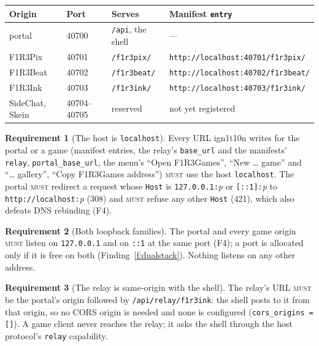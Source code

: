 \documentclass[11pt]{article}
\theoremstyle{definition}
\newtheorem{requirement}{Requirement}
\theoremstyle{remark}
\newcommand{\MUST}{\textsc{must}}
\newcommand{\code}[1]{\texttt{#1}}
\newcommand{\Hr}{ign1t10n}
\newcommand{\Gm}{F1R3Games}
\begin{document}
\begin{center}\small
\renewcommand{\arraystretch}{1.1}
\begin{tabular}{@{}llll@{}}
\toprule
Origin & Port & Serves & Manifest \code{entry}\\
\midrule
portal & 40700 & \code{/api}, the shell & ---\\
F1R3Pix & 40701 & \code{/f1r3pix/} & \code{http://localhost:40701/f1r3pix/}\\
F1R3Beat & 40702 & \code{/f1r3beat/} & \code{http://localhost:40702/f1r3beat/}\\
F1R3Ink & 40703 & \code{/f1r3ink/} & \code{http://localhost:40703/f1r3ink/}\\
SideChat, Skein & 40704--40705 & reserved & not yet registered\\
\bottomrule
\end{tabular}
\end{center}

\begin{requirement}[The host is \code{localhost}]
Every URL \Hr{} writes for the portal or a game (manifest entries, the relay's
\code{base\_url} and the manifests' \code{relay}, \code{portal\_base\_url}, the
menu's ``Open \Gm{}'', ``New \ldots{} game'' and ``\ldots{} gallery'', ``Copy \Gm{}
address'') \MUST{} use the host \code{localhost}. The portal \MUST{} redirect a request whose
\code{Host} is \code{127.0.0.1:}\textit{p} or \code{[::1]:}\textit{p} to
\code{http://localhost:}\textit{p} (308) and \MUST{} refuse any other \code{Host}
(421), which also defeats DNS rebinding (F4).
\end{requirement}

\begin{requirement}[Both loopback families]
The portal and every game origin \MUST{} listen on \code{127.0.0.1} and on
\code{::1} at the same port (F4); a port is allocated only if it is free on both
(Finding~\ref{f:dualstack}). Nothing listens on any other address.
\end{requirement}

\begin{requirement}[The relay is same-origin with the shell]
The relay's URL \MUST{} be the portal's origin followed by
\code{/api/relay/f1r3ink}: the shell posts to it from that origin, so no CORS origin is needed and none is
configured (\code{cors\_origins = []}). A game client never reaches the relay; it asks
the shell through the host protocol's \code{relay} capability.
\end{requirement}
\end{document}
